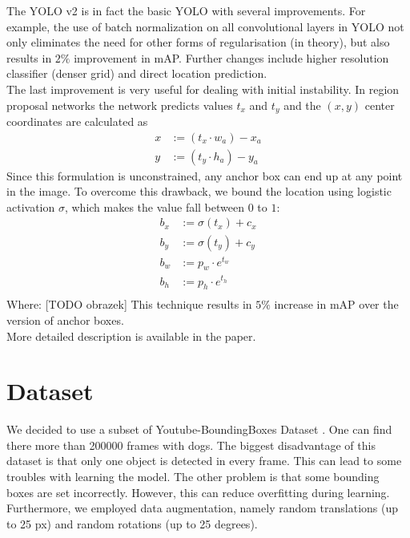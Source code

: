 \documentclass{article}
\begin{document}
The YOLO v2 is in fact the basic YOLO with several improvements. For example, the use of batch normalization on all convolutional layers in YOLO not only eliminates the need for other forms of regularisation (in theory), but also results in $2\%$ improvement in mAP. Further changes include higher resolution classifier (denser grid) and direct location prediction. \\
The last improvement is very useful for dealing with initial instability. In region proposal networks the network predicts values $t_x$ and $t_y$ and the $(x,y)$ center coordinates are calculated as
\begin{equation}
\begin{aligned}
x &:= (t_x \cdot w_a)-x_a \\
y &:= (t_y \cdot h_a)-y_a
\end{aligned}
\end{equation}
Since this formulation is unconstrained, any anchor box can end up at any point in the image. To overcome this drawback, we bound the location using logistic activation $\sigma$, which makes the value fall between $0$ to $1$:
\begin{equation}
\begin{aligned}
b_x &:= \sigma(t_x) + c_x \\
b_y &:= \sigma(t_y) + c_y \\
b_w &:= p_w \cdot e^{t_w} \\
b_h &:= p_h \cdot e^{t_h} \\
\end{aligned}
\end{equation}
Where: [TODO obrazek]
This technique results in $5\%$ increase in mAP over the version of anchor boxes.
\\ More detailed description is available in the paper.

\section*{Dataset}
We decided to use a subset of Youtube-BoundingBoxes Dataset \cite{youtube-bb}. One can find there more than 200000 frames with dogs. The biggest disadvantage of this dataset is that only one object is detected in every frame. This can lead to some troubles with learning the model. The other problem is that some bounding boxes are set incorrectly. However, this can reduce overfitting during learning.
Furthermore, we employed data augmentation, namely random translations (up to 25 px) and random rotations (up to 25 degrees).
\end{document}
